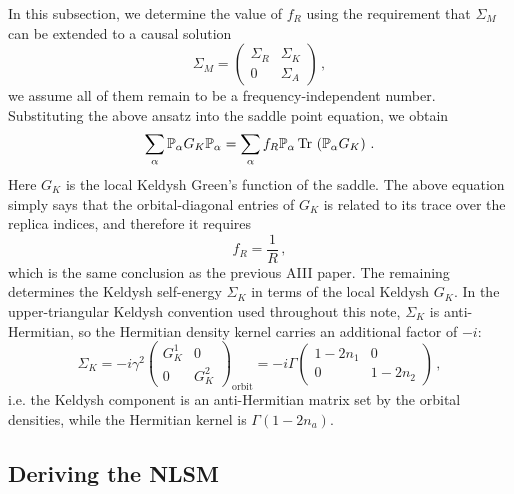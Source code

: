 \documentclass[aps,prx,preprint,amsmath,amssymb]{revtex4-2}
\newcommand{\Tr}{{\rm \, Tr\,}}
\begin{document}
  In this subsection, we determine the value of $f_R$ using the requirement that $\Sigma_M$ can be extended to a causal solution 
\begin{equation}\label{}
  \Sigma_M =\begin{pmatrix}
              \Sigma_R & \Sigma_K \\
              0 & \Sigma_A 
            \end{pmatrix}\,,
\end{equation} we assume all of them remain to be a frequency-independent number. Substituting the above ansatz into the saddle point equation, we obtain 
\begin{equation}\label{}
  \sum_{\alpha}\mathbb{P}_\alpha G_K \mathbb{P}_\alpha = \sum_{\alpha} f_R \mathbb{P}_\alpha \Tr\left(\mathbb{P}_\alpha G_K\right)\,.
\end{equation} Here $G_K$ is the local Keldysh Green's function of the saddle. The above equation simply says that the orbital-diagonal entries of $G_K$ is related to its trace over the replica indices, and therefore it requires 
\begin{equation}\label{}
  f_R=\frac{1}{R}\,,
\end{equation} which is the same conclusion as the previous AIII paper. The remaining determines the Keldysh self-energy $\Sigma_K$ in terms of the local Keldysh $G_K$.  In the upper-triangular Keldysh convention used throughout this note, $\Sigma_K$ is anti-Hermitian, so the Hermitian density kernel carries an additional factor of $-i$:
\begin{equation}\label{}
  \Sigma_K=-i \gamma^2\begin{pmatrix}
             G_K^1 & 0 \\
             0 & G_K^2 
           \end{pmatrix}_\text{orbit}=-i\Gamma\begin{pmatrix}
                                              1-2n_1 & 0 \\
                                              0 & 1-2n_2 
                                            \end{pmatrix}\,,
\end{equation} i.e. the Keldysh component is an anti-Hermitian matrix set by the orbital densities, while the Hermitian kernel is $\Gamma(1-2n_a)$. 

\subsection{Deriving the NLSM}
\end{document}

